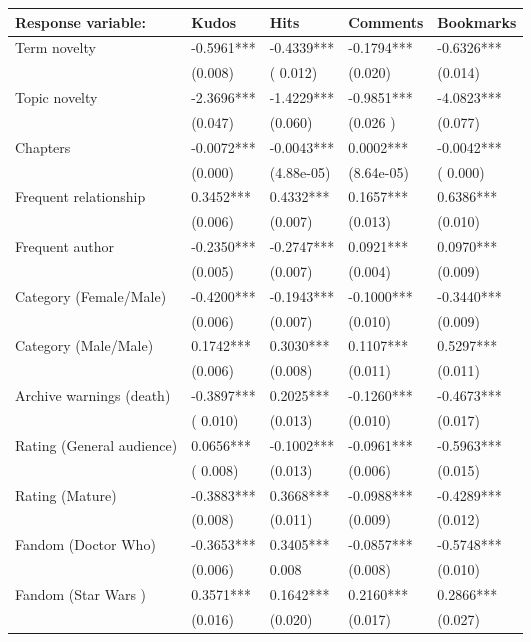 \documentclass[a4paper]{article}
\begin{document}
 \begin{table}
\centering
\begin{tabular}[width=0.8\textwidth]{p{4cm}p{3cm}p{3cm}p{3cm}p{3cm}}
\toprule
Response variable: & Kudos & Hits & Comments & Bookmarks \\ 
   \hline			
Term novelty & -0.5961***&  -0.4339***  & -0.1794*** & -0.6326*** \\
& (0.008) & ( 0.012) & (0.020) & (0.014)\\
Topic novelty & -2.3696*** & -1.4229*** & -0.9851*** & -4.0823*** \\
& (0.047) & (0.060) &  (0.026 ) & (0.077)\\
Chapters & -0.0072***& -0.0043*** & 0.0002***& -0.0042*** \\
& (0.000) & (4.88e-05) & (8.64e-05) & ( 0.000) \\
Frequent relationship & 0.3452*** & 0.4332*** & 0.1657*** & 0.6386***\\
& (0.006) & (0.007) & (0.013) & (0.010)\\
Frequent author & -0.2350*** & -0.2747*** & 0.0921*** & 0.0970***\\
& (0.005) & (0.007) & (0.004) & (0.009)\\
Category (Female/Male) & -0.4200*** & -0.1943*** & -0.1000*** & -0.3440***\\
& (0.006) & (0.007) & (0.010) & (0.009)\\
Category (Male/Male) & 0.1742*** & 0.3030*** & 0.1107*** & 0.5297***\\
& (0.006) & (0.008) & (0.011) & (0.011)\\
Archive warnings (death) & -0.3897*** & 0.2025*** & -0.1260*** & -0.4673***\\
& ( 0.010) & (0.013) & (0.010) & (0.017)\\
Rating (General audience) & 0.0656*** & -0.1002*** & -0.0961*** & -0.5963***\\
& ( 0.008) & (0.013) & (0.006) & (0.015)\\
Rating (Mature) & -0.3883*** & 0.3668*** & -0.0988*** & -0.4289***\\
& (0.008) & (0.011) & (0.009) & (0.012)\\
Fandom (Doctor Who) & -0.3653*** & 0.3405*** & -0.0857*** & -0.5748***\\
& (0.006) & 0.008 & (0.008) & (0.010)\\
Fandom (Star Wars ) & 0.3571*** & 0.1642*** & 0.2160*** & 0.2866***\\
& (0.016) & (0.020) & (0.017) & (0.027)\\

\end{tabular}
\end{table}
\end{document}

